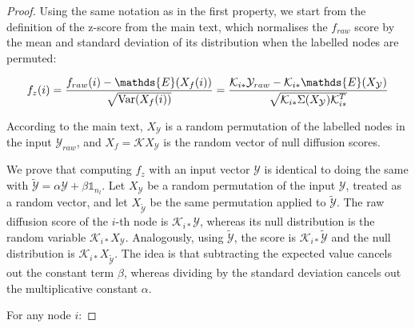 \documentclass[12pt]{article}  %
\begin{document}
\begin{proof}

Using the same notation as in the first property, we start from the definition of the z-score from the main text, which normalises the $f_{raw}$ score by the mean and standard deviation of its distribution when the labelled nodes are permuted:

$$f_z (i) = \frac{f_{raw}(i) - \mathds{E}(X_f (i))}{ \sqrt{ \textrm{Var}(X_f (i)) }} = \frac{\mathcal{K}_{i*} \mathcal{Y}_{raw} - \mathcal{K}_{i*} \mathds{E}(X_\mathcal{Y})}{\sqrt{\mathcal{K}_{i*}\Sigma(X_\mathcal{Y}) \mathcal{K}_{i*}^T}} \\$$ 

According to the main text, $X_{\mathcal{Y}}$ is a random permutation of the labelled nodes in the input $\mathcal{Y}_{raw}$, and $X_f = \mathcal{K}X_\mathcal{Y}$ is the random vector of null diffusion scores.

We prove that computing $f_z$ with an input vector $\mathcal{Y}$ is identical to doing the same with $\tilde{\mathcal{Y}} = \alpha \mathcal{Y} + \beta\mathbb{1}_{n_l} $. 
Let $X_{\mathcal{Y}}$ be a random permutation of the input $\mathcal{Y}$, treated as a random vector, and let $X_{\tilde{\mathcal{Y}}}$ be the same permutation applied to $\tilde{\mathcal{Y}}$.
The raw diffusion score of the $i$-th node is $\mathcal{K}_{i*}\mathcal{Y}$, whereas its null distribution is the random variable $\mathcal{K}_{i*}X_{\mathcal{Y}}$. 
Analogously, using $\tilde{\mathcal{Y}}$, the score is $\mathcal{K}_{i*}\tilde{\mathcal{Y}}$ and the null distribution is $\mathcal{K}_{i*}X_{\tilde{\mathcal{Y}}}$.
The idea is that subtracting the expected value cancels out the constant term $\beta$, whereas dividing by the standard deviation cancels out the multiplicative constant $\alpha$.

For any node $i$:


\end{proof}
\end{document}
